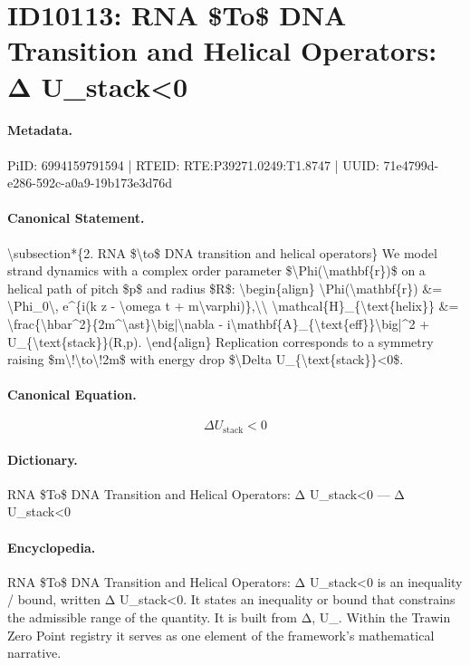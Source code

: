 \section*{ID10113: RNA \$To\$ DNA Transition and Helical Operators: Δ U\_stack<0}
\paragraph{Metadata.}
PiID: 6994159791594 | RTEID: RTE:P39271.0249:T1.8747 | UUID: 71e4799d-e286-592c-a0a9-19b173e3d76d

\paragraph{Canonical Statement.}
\textbackslash{}subsection*\{2. RNA \$\textbackslash{}to\$ DNA transition and helical operators\} We model strand dynamics with a complex order parameter \$\textbackslash{}Phi(\textbackslash{}mathbf\{r\})\$ on a helical path of pitch \$p\$ and radius \$R\$: \textbackslash{}begin\{align\} \textbackslash{}Phi(\textbackslash{}mathbf\{r\}) \&= \textbackslash{}Phi\_0\textbackslash{}, e\textasciicircum{}\{i(k z - \textbackslash{}omega t + m\textbackslash{}varphi)\},\textbackslash{}\textbackslash{} \textbackslash{}mathcal\{H\}\_\{\textbackslash{}text\{helix\}\} \&= \textbackslash{}frac\{\textbackslash{}hbar\textasciicircum{}2\}\{2m\textasciicircum{}\textbackslash{}ast\}\textbackslash{}big|\textbackslash{}nabla - i\textbackslash{}mathbf\{A\}\_\{\textbackslash{}text\{eff\}\}\textbackslash{}big|\textasciicircum{}2 + U\_\{\textbackslash{}text\{stack\}\}(R,p). \textbackslash{}end\{align\} Replication corresponds to a symmetry raising \$m\textbackslash{}!\textbackslash{}to\textbackslash{}!2m\$ with energy drop \$\textbackslash{}Delta U\_\{\textbackslash{}text\{stack\}\}<0\$.

\paragraph{Canonical Equation.}
\[
\Delta U_{\text{stack}}<0
\]

\paragraph{Dictionary.}
RNA \$To\$ DNA Transition and Helical Operators: Δ U\_stack<0 — Δ U\_stack<0

\paragraph{Encyclopedia.}
RNA \$To\$ DNA Transition and Helical Operators: Δ U\_stack<0 is an inequality / bound, written Δ U\_stack<0. It states an inequality or bound that constrains the admissible range of the quantity. It is built from Δ, U\_. Within the Trawin Zero Point registry it serves as one element of the framework's mathematical narrative.
